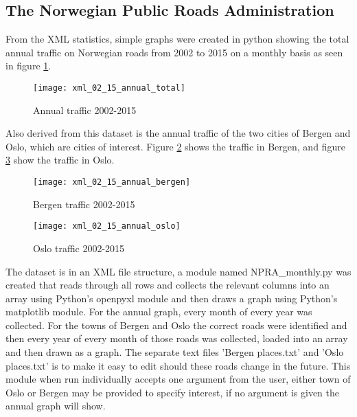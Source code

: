 \newpage









\subsection{The Norwegian Public Roads Administration}
From the XML statistics, simple graphs were created in python showing the total annual traffic on Norwegian roads from 2002 to 2015 on a monthly basis as seen in figure \ref{fig:anualtotal}.

\begin{figure}[ht]
\texttt{[image: xml\_02\_15\_annual\_total]}
\centering
\caption{Annual traffic 2002-2015}
\label{fig:anualtotal}
\end{figure}

Also derived from this dataset is the annual traffic of the two cities of Bergen and Oslo, which are cities of interest. Figure \ref{fig:anualbergen} shows the traffic in Bergen, and figure \ref{fig:anualoslo} show the traffic in Oslo.

\begin{figure}[ht]
\texttt{[image: xml\_02\_15\_annual\_bergen]}
\centering
\caption{Bergen traffic 2002-2015}
\label{fig:anualbergen}
\end{figure}

\begin{figure}[ht]
\texttt{[image: xml\_02\_15\_annual\_oslo]}
\centering
\caption{Oslo traffic 2002-2015}
\label{fig:anualoslo}
\end{figure}
The dataset is in an XML file structure, a module named NPRA\_monthly.py was created that reads through all rows and collects the relevant columns into an array using Python's openpyxl module and then draws a graph using Python's matplotlib module. For the annual graph, every month of every year was collected. For the towns of Bergen and Oslo the correct roads were identified and then every year of every month of those roads was collected, loaded into an array and then drawn as a graph. The separate text files 'Bergen places.txt' and 'Oslo places.txt' is to make it easy to edit should these roads change in the future. This module when run individually accepts one argument from the user, either town of Oslo or Bergen may be provided to specify interest, if no argument is given the annual graph will show.

